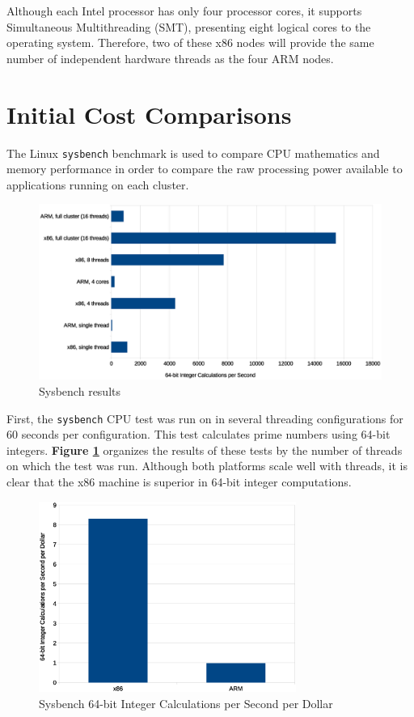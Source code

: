 \documentclass[11pt]{book}
\begin{document}
Although each Intel processor has only four processor cores, it supports
Simultaneous Multithreading (SMT), presenting eight logical cores to the
operating system. Therefore, two of these x86 nodes will provide the same number
of independent hardware threads as the four ARM nodes.

\section{\textbf{Initial Cost Comparisons}}

The Linux \verb;sysbench; benchmark is used to compare CPU mathematics and
memory performance in order to compare the raw processing power available to
applications running on each cluster.

\begin{figure}
\centering
\includegraphics[width=\textwidth]{sysbench_all}
\caption{Sysbench results}
\label{sysbench-all}
\end{figure}

First, the \verb;sysbench; CPU test was
run on in several threading configurations for 60 seconds per
configuration. This test calculates prime numbers using 64-bit
integers. \textbf{Figure \ref{sysbench-all}} organizes the results of these
tests by the number of threads on which the test was run. Although both
platforms scale well with threads, it is clear that the x86 machine is superior
in 64-bit integer computations. 

\begin{figure}
\centering
\includegraphics[width=0.75\textwidth]{sysbench_cost}
\caption{Sysbench 64-bit Integer Calculations per Second per Dollar}
\label{sysbench-cost}
\end{figure}
\end{document}
